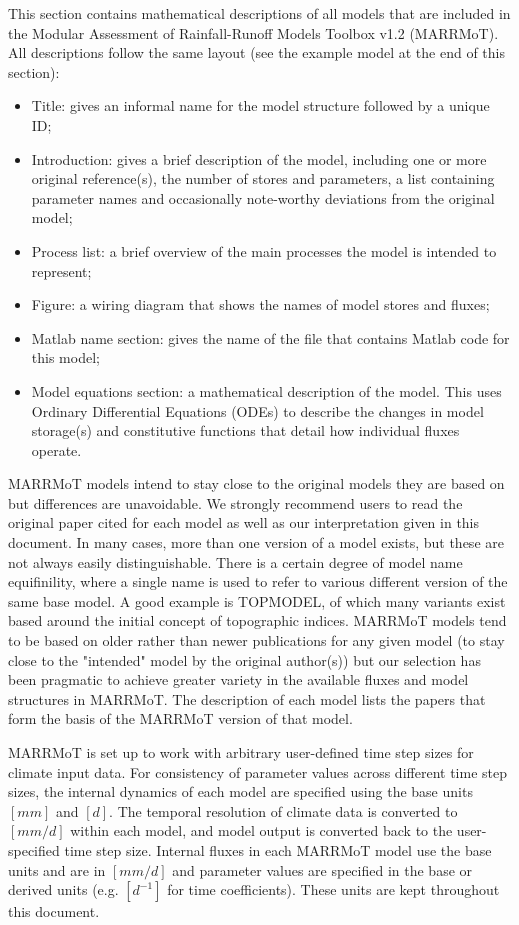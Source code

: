 This section contains mathematical descriptions of all models that are included in the Modular Assessment of Rainfall-Runoff Models Toolbox v1.2 (MARRMoT). All descriptions follow the same layout (see the example model at the end of this section):

\begin{itemize}
	\item Title: gives an informal name for the model structure followed by a unique ID;
	\item Introduction: gives a brief description of the model, including one or more original reference(s), the number of stores and parameters, a list containing parameter names and occasionally note-worthy deviations from the original model;
	\item Process list: a brief overview of the main processes the model is intended to represent;
	\item Figure: a wiring diagram that shows the names of model stores and fluxes;
	\item Matlab name section: gives the name of the file that contains Matlab code for this model;
	\item Model equations section: a mathematical description of the model. This uses Ordinary Differential Equations (ODEs) to describe the changes in model storage(s) and constitutive functions that detail how individual fluxes operate.
\end{itemize}

MARRMoT models intend to stay close to the original models they are based on but differences are unavoidable. We strongly recommend users to read the original paper cited for each model as well as our interpretation given in this document. In many cases, more than one version of a model exists, but these are not always easily distinguishable. There is a certain degree of model name equifinility, where a single name is used to refer to various different version of the same base model. A good example is TOPMODEL, of which many variants exist based around the initial concept of topographic indices. MARRMoT models tend to be based on older rather than newer publications for any given model (to stay close to the "intended" model by the original author(s)) but our selection has been pragmatic to achieve greater variety in the available fluxes and model structures in MARRMoT. The description of each model lists the papers that form the basis of the MARRMoT version of that model.

MARRMoT is set up to work with arbitrary user-defined time step sizes for climate input data. For consistency of parameter values across different time step sizes, the internal dynamics of each model are specified using the base units $[mm]$ and $[d]$. The temporal resolution of climate data is converted to $[mm/d]$ within each model, and model output is converted back to the user-specified time step size. Internal fluxes in each MARRMoT model use the base units and are in $[mm/d]$ and parameter values are specified in the base or derived units (e.g. $[d^{-1}]$ for time coefficients). These units are kept throughout this document. 


